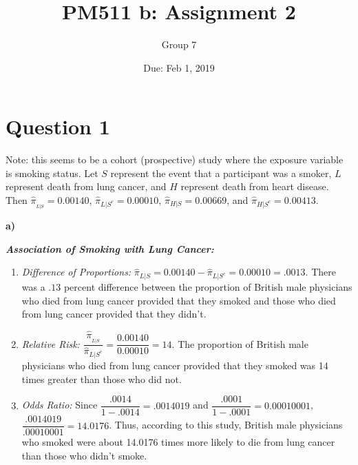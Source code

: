 \documentclass{article}
\title{PM511 b: Assignment 2}
\author{Group 7}
\date{Due: Feb 1, 2019}
\begin{document}
\selectfont

\maketitle

\section*{Question 1}

Note: this seems to be a cohort (prospective) study where the exposure variable is smoking status. Let $S$ represent the event that a participant was a smoker, $L$ represent death from lung cancer, and $H$ represent death from heart disease. Then $\hat{\pi}__{L|S}=0.00140$, $\hat{\pi}_{L|S^c}=0.00010$, $\hat{\pi}_{H|S}=0.00669$, and $\hat{\pi}_{H|S^c}=0.00413$.

\textbf{a)}

\textit{\textbf{Association of Smoking with Lung Cancer:}}
\begin{enumerate}
\item
    \textit{Difference of Proportions:} $\hat{\pi}_{L|S}=0.00140 - \hat{\pi}_{L|S^c}=0.00010= .0013.$ There was a $.13$ percent difference between the proportion of British male physicians who died from lung cancer provided that they smoked and those who died from lung cancer provided that they didn't.
    \item
    \textit{Relative Risk:}
    $\dfrac{\hat{\pi}__{L|S}}{\hat{\pi}_{L|S^c}}=\dfrac{0.00140}{0.00010}=14$. The proportion of British male physicians who died from lung cancer provided that they smoked was 14 times greater than those who did not. 
    \item
       \textit{Odds Ratio:}
       Since $\dfrac{.0014}{1-.0014}=.0014019$ and $\dfrac{.0001}{1-.0001}=0.00010001$, $\dfrac{.0014019}{.00010001}=14.0176$. Thus, according to this study, British male physicians who smoked were about 14.0176 times more likely to die from lung cancer than those who didn't smoke.
\end{enumerate}
\end{document}

